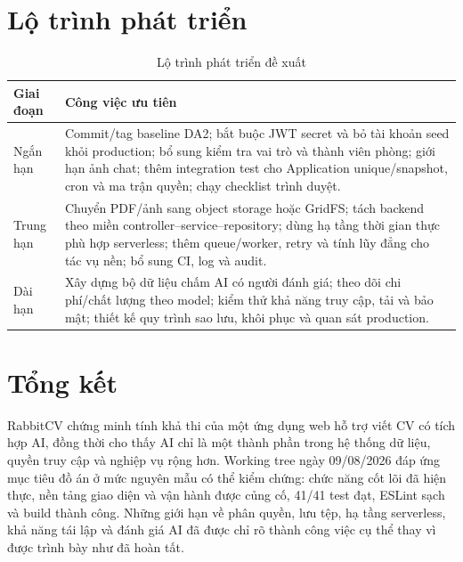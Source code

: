 \section{Lộ trình phát triển}

\begin{table}[H]
    \centering
    \small
    \begin{tabularx}{\textwidth}{|p{}|Y|} \hline
        \textbf{Giai đoạn} & \textbf{Công việc ưu tiên} \\ \hline
        Ngắn hạn & Commit/tag baseline DA2; bắt buộc JWT secret và bỏ tài khoản seed khỏi production; bổ sung kiểm tra vai trò và thành viên phòng; giới hạn ảnh chat; thêm integration test cho Application unique/snapshot, cron và ma trận quyền; chạy checklist trình duyệt. \\ \hline
        Trung hạn & Chuyển PDF/ảnh sang object storage hoặc GridFS; tách backend theo miền controller--service--repository; dùng hạ tầng thời gian thực phù hợp serverless; thêm queue/worker, retry và tính lũy đẳng cho tác vụ nền; bổ sung CI, log và audit. \\ \hline
        Dài hạn & Xây dựng bộ dữ liệu chấm AI có người đánh giá; theo dõi chi phí/chất lượng theo model; kiểm thử khả năng truy cập, tải và bảo mật; thiết kế quy trình sao lưu, khôi phục và quan sát production. \\ \hline
    \end{tabularx}
    \caption{Lộ trình phát triển đề xuất}
    \label{tab:roadmap}
\end{table}

\section{Tổng kết}

RabbitCV chứng minh tính khả thi của một ứng dụng web hỗ trợ viết CV có tích hợp AI, đồng thời cho thấy AI chỉ là một thành phần trong hệ thống dữ liệu, quyền truy cập và nghiệp vụ rộng hơn. Working tree ngày 09/08/2026 đáp ứng mục tiêu đồ án ở mức nguyên mẫu có thể kiểm chứng: chức năng cốt lõi đã hiện thực, nền tảng giao diện và vận hành được củng cố, 41/41 test đạt, ESLint sạch và build thành công. Những giới hạn về phân quyền, lưu tệp, hạ tầng serverless, khả năng tái lập và đánh giá AI đã được chỉ rõ thành công việc cụ thể thay vì được trình bày như đã hoàn tất.
